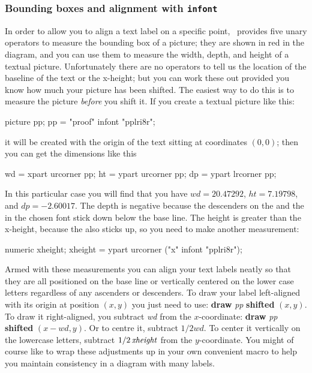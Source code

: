 \documentclass[a4paper,landscape]{article}
\def\kw#1{\begingroup\def\_{\kern.04em
    \vbox{\hrule width.3em height .6pt}\kern.08em}%
\ifmmode\mathop{\textbf{#1}}\else\hbox{\bf#1\/}\fi\endgroup}
\def\id#1{\begingroup\def\_{\kern.04em
    \vbox{\hrule width.3em height .6pt}\kern.08em}%
\ifmmode\mathop{\textit{#1}}\else\hbox{\it#1\/}\fi\endgroup}
\begin{document}
\newpage
\subsubsection{Bounding boxes and alignment with \texttt{infont}}
\label{infontbbox}

In order to allow you to align a text label on a specific point, \MP\ provides five
unary operators 
to measure the bounding box of a picture;
they are shown in \textcolor{red!67!black}{red} in the diagram, and you can use them
to measure the width, depth, and height of a textual picture.  Unfortunately there
are
no operators to tell us the location of the baseline of the text or the x-height;
but you can work these out provided you know how much your picture has been shifted.
The easiest way to do this is to 
measure the picture \textit{before} you shift it.
If you create a textual picture like this:
\begin{code}
    picture pp; pp = "proof" infont "pplri8r";
\end{code}
it will be created with the origin of the text sitting at coordinates $(0,0)$;
then you can get the dimensions like this
\begin{code}
    wd = xpart urcorner pp;
    ht = ypart urcorner pp;
    dp = ypart lrcorner pp;
\end{code}
In this particular case you will find that you have $wd=20.47292$, $ht=7.19798$, and 
$dp=-2.60017$.  The depth is negative because the descenders on the
 and the 
in the chosen font stick down below the base line.  The height is greater than the
x-height, because the  also sticks up, so you need to make another measurement:
\begin{code}
    numeric xheight; xheight = ypart urcorner ("x" infont "pplri8r");
\end{code}
Armed with these measurements you can align your text labels neatly so that they are
all positioned on the base line or vertically centered on the lower case letters
regardless of any ascenders or descenders.  To draw your label left-aligned with its
origin at position $(x,y)$ you just need to use: \kw{draw} \id{pp} \kw{shifted} $(x,y)$.  
To draw it right-aligned, you subtract
\id{wd} from the $x$-coordinate: \kw{draw} \id{pp} \kw{shifted} $(x-wd,y)$.  Or to
centre it, subtract $1/2wd$.  To center it vertically on the lowercase letters,
subtract $1/2\id{xheight}$ from the $y$-coordinate.  You might of course like to
wrap these adjustments up in your own convenient macro to help you maintain
consistency in a diagram with many labels.
\end{document}
